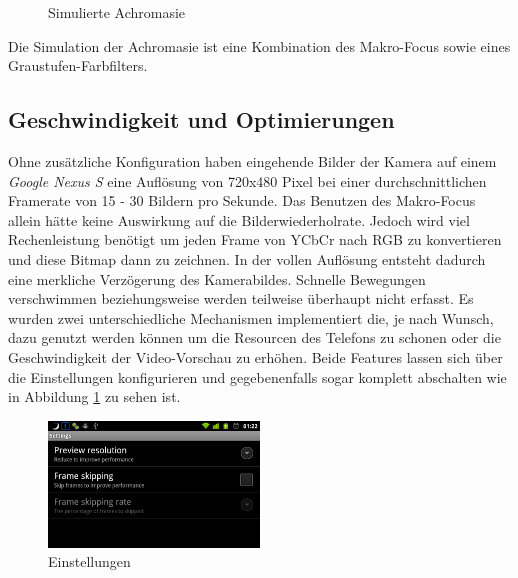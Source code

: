 \documentclass[a4paper]{article}
\begin{document}
\begin{figure}[H]
\centering
{}
\caption{Simulierte Achromasie}
\end{figure}

Die Simulation der Achromasie ist eine Kombination des Makro-Focus sowie eines Graustufen-Farbfilters.

\newpage

\subsection*{Geschwindigkeit und Optimierungen}
Ohne zusätzliche Konfiguration haben eingehende Bilder der Kamera auf einem \textit{Google Nexus S} eine Auflösung von 720x480 Pixel bei einer durchschnittlichen Framerate von 15 - 30 Bildern pro Sekunde. Das Benutzen des Makro-Focus allein hätte keine Auswirkung auf die Bilderwiederholrate. Jedoch wird viel Rechenleistung benötigt um jeden Frame von YCbCr nach RGB zu konvertieren und diese Bitmap dann zu zeichnen. In der vollen Auflösung entsteht dadurch eine merkliche Verzögerung des Kamerabildes. Schnelle Bewegungen verschwimmen beziehungsweise werden teilweise überhaupt nicht erfasst. Es wurden zwei unterschiedliche Mechanismen implementiert die, je nach Wunsch, dazu genutzt werden können um die Resourcen des Telefons zu schonen oder die Geschwindigkeit der Video-Vorschau zu erhöhen. Beide Features lassen sich über die Einstellungen konfigurieren und gegebenenfalls sogar komplett abschalten wie in Abbildung \ref{settings} zu sehen ist.

\begin{figure}[H]
\centering
\includegraphics[width=0.5\textwidth, trim=0 0 0 39, clip=true]{settings.png}
\caption{Einstellungen}
\label{settings}
\end{figure}
\end{document}
